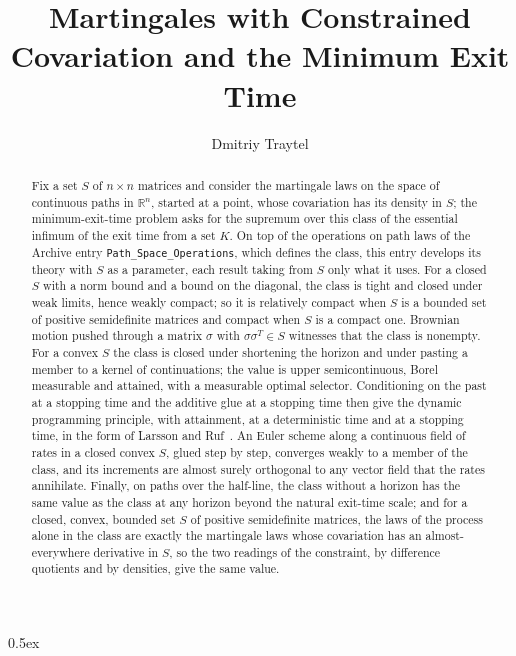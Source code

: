 \documentclass[11pt,a4paper]{article}
\begin{document}
\title{Martingales with Constrained Covariation and the Minimum Exit Time}
\author{Dmitriy Traytel}
\maketitle

\begin{abstract}
  Fix a set $S$ of $n \times n$ matrices and consider the martingale laws
  on the space of continuous paths in $\mathbb{R}^n$, started at a point,
  whose covariation has its density in $S$; the minimum-exit-time problem
  asks for the supremum over this class of the essential infimum of the
  exit time from a set $K$.  On top of the operations on path laws of the
  Archive entry \texttt{Path\_Space\_Operations}, which defines the class,
  this entry develops its theory with $S$ as a parameter, each result
  taking from $S$ only what it uses.  For a closed $S$ with a norm bound
  and a bound on the diagonal, the class is tight and closed under weak
  limits, hence weakly compact; so it is relatively compact when $S$ is a
  bounded set of positive semidefinite matrices and compact when $S$ is a
  compact one.  Brownian motion pushed through a matrix $\sigma$ with
  $\sigma\sigma^{T} \in S$ witnesses that the class is nonempty.  For a
  convex $S$ the class is closed under shortening the horizon and under
  pasting a member to a kernel of continuations; the value is upper
  semicontinuous, Borel measurable and attained, with a measurable optimal
  selector.  Conditioning on the past at a stopping time and the additive
  glue at a stopping time then give the dynamic programming principle,
  with attainment, at a deterministic time and at a stopping time, in the
  form of Larsson and Ruf~\cite{LarssonRuf}.  An Euler scheme along a continuous
  field of rates in a closed convex $S$, glued step by step, converges
  weakly to a member of the class, and its increments are almost surely
  orthogonal to any vector field that the rates annihilate.  Finally, on paths over the half-line,
  the class without a horizon has the same value as the class at any
  horizon beyond the natural exit-time scale; and for a closed, convex,
  bounded set $S$ of positive semidefinite matrices, the laws of the
  process alone in the class are exactly the martingale laws whose
  covariation has an almost-everywhere derivative in $S$, so the two
  readings of the constraint, by difference quotients and by densities,
  give the same value.
\end{abstract}

\tableofcontents

\parindent 0pt\parskip 0.5ex





\end{document}
